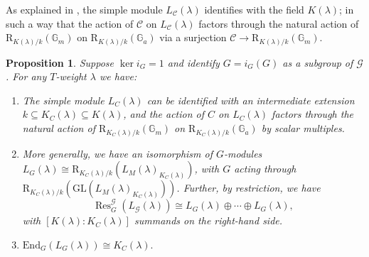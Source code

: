 \documentclass[11pt,reqno]{amsart}
\newtheorem{prop}[lemma]{Proposition}
\theoremstyle{definition}
\theoremstyle{remark}
\theoremstyle{definition}
\theoremstyle{plain}
\DeclareMathOperator{\Res}{Res}
\newcommand{\R}{\mathrm{R}}
\newcommand{\G}{\mathscr{G}}
\newcommand{\GL}{\mathrm{GL}}
\newcommand{\End}{\mathrm{End}}
\newcommand{\Gm}{\mathbb{G}_m}
\newcommand{\Ga}{\mathbb{G}_a}
\newcommand{\C}{\mathscr{C}}
\begin{document}
As explained in \cite[Thm.~5.8]{BS22}, the simple module $L_{\C}(\lambda)$ identifies with the field $K(\lambda)$; in such a way that the action of $\C$ on $L_\C(\lambda)$ factors through the natural action of $\R_{K(\lambda)/k}(\Gm)$ on $\R_{K(\lambda)/k}(\Ga)$ via a surjection $\C\to \R_{K(\lambda)/k}(\Gm)$. 


\begin{prop}\label{prop:splitend}
Suppose $\ker i_G=1$ and identify $G=i_G(G)$ as a subgroup of $\G$. For any $T$-weight $\lambda$ we have:
\begin{enumerate}
\item The simple module $L_C(\lambda)$ can be identified with an intermediate extension $k\subseteq K_C(\lambda) \subseteq K(\lambda)$, 
and the action of $C$ on $L_C(\lambda)$ factors through the natural action of $\R_{K_C(\lambda)/k}(\Gm)$ on $\R_{K_C(\lambda)/k}(\Ga)$ by scalar multiples.
\item More generally,  we have an isomorphism of $G$-modules $L_G(\lambda)\cong \R_{K_C(\lambda)/k}(L_M(\lambda)_{K_C(\lambda)})$, with $G$
acting through $\R_{K_C(\lambda)/k}(\GL(L_M(\lambda)_{K_C(\lambda)}))$.
Further, by restriction, we have
$$
\Res^{\G}_G(L_{\G}(\lambda)) \cong L_G(\lambda)\oplus\cdots\oplus L_G(\lambda),
$$
with $[K(\lambda):K_C(\lambda)]$ summands on the right-hand side.\vspace{5pt}
\item \hspace{0.3\textwidth}$\End_G(L_G(\lambda))\cong K_C(\lambda).$\label{prop:splitend:end}
\end{enumerate}
\end{prop}
\end{document}
